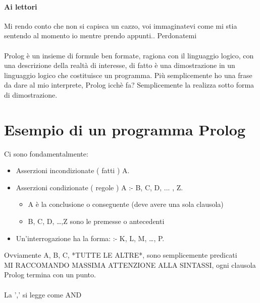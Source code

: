 \documentclass[12pt, a4paper, openany, oneside]{book}
\begin{document}
{\paragraph{Ai lettori} Mi rendo conto che non si capisca un cazzo, voi 
immaginatevi come mi stia sentendo al momento io mentre prendo appunti.. 
Perdonatemi
\\ \\
Prolog è un insieme di formule ben formate, ragiona con il linguaggio logico, 
con una descrizione della realtà di interesse, di fatto è una dimostrazione in 
un linguaggio logico che costituisce un programma. Più semplicemente ho una  
frase da dare al mio interprete, Prolog icchè fa? Semplicemente la realizza  
sotto forma di dimostrazione. 
\\ 
\section{Esempio di un programma Prolog}
Ci sono fondamentalmente:
\begin{itemize}
	\item Asserzioni incondizionate (\color{red} fatti \color{black})
	A.
	\item Asserzioni condizionate (\color{red} regole \color{black})
	A :- B, C, D, ... , Z.
	\begin{itemize}
		\item A è la conclusione o conseguente (deve avere una sola clausola)
		\item B, C, D, \dots,Z sono le premesse o antecedenti 
	\end{itemize} 
	\item Un'\color{red}interrogazione \color{black} ha la forma: :- K, L, M, 
	\dots, P. \\
\end{itemize}
Ovviamente A, B, C, *TUTTE LE ALTRE*, sono semplicemente predicati
\\
MI RACCOMANDO MASSIMA ATTENZIONE ALLA SINTASSI, ogni clausola Prolog termina
con un punto. \\ \\
La ',' si legge come AND
}
\end{document}
